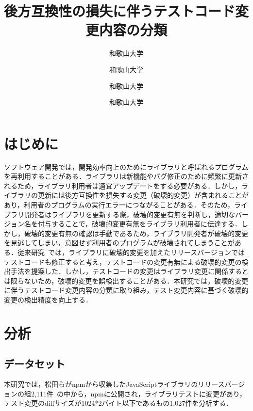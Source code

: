 \documentclass[uplatex,dvipdfmx,a4paper,twocolumn,base=11pt,jbase=11pt,ja=standard]{bxjsarticle}  %
\title{後方互換性の損失に伴うテストコード変更内容の分類}{A classification of test code changes accompanied by a lack of backward compatibility}
\author{和歌山大学}{前川　大樹}{Daiki Maekawa, Wakayama University}
\author{和歌山大学}{伊原　彰紀}{Akinori Ihara, Wakayama University}
\author{和歌山大学}{大森　楓己}{Fuki Omori, Wakayama University}
\author{和歌山大学}{才木　一也}{Kazuya Saiki, Wakayama University}
\begin{document}
\maketitle

\section{はじめに}

ソフトウェア開発では，開発効率向上のためにライブラリと呼ばれるプログラムを再利用することがある．ライブラリは新機能やバグ修正のために頻繁に更新されるため，ライブラリ利用者は適宜アップデートをする必要がある．しかし，ライブラリの更新には後方互換性を損失する変更（破壊的変更）が含まれることがあり，利用者のプログラムの実行エラーにつながることがある．そのため，ライブラリ開発者はライブラリを更新する際，破壊的変更有無を判断し，適切なバージョン名を付与することで，破壊的変更有無をライブラリ利用者に伝達する．しかし，破壊的変更有無の確認は手動であるため，ライブラリ開発者が破壊的変更を見逃してしまい，意図せず利用者のプログラムが破壊されてしまうことがある．従来研究~\cite{FOSE2021_Matsuda}では，ライブラリに破壊的変更を加えたリリースバージョンではテストコードも修正すると考え，テストコードの変更有無による破壊的変更の検出手法を提案した．しかし，テストコードの変更はライブラリ変更に関係するとは限らないため，破壊的変更を誤検出することがある．本研究では，破壊的変更に伴うテストコード変更内容の分類に取り組み，テスト変更内容に基づく破壊的変更の検出精度を向上する．

\section{分析}
\subsection{データセット}

本研究では，松田らがnpmから収集したJavaScriptライブラリのリリースバージョンの組2,111件~\cite{FOSE2021_Matsuda}の中から，npmに公開され，ライブラリテストに変更があり，テスト変更のdiffサイズが1024*2バイト以下であるもの1,027件を分析する．
\end{document}
